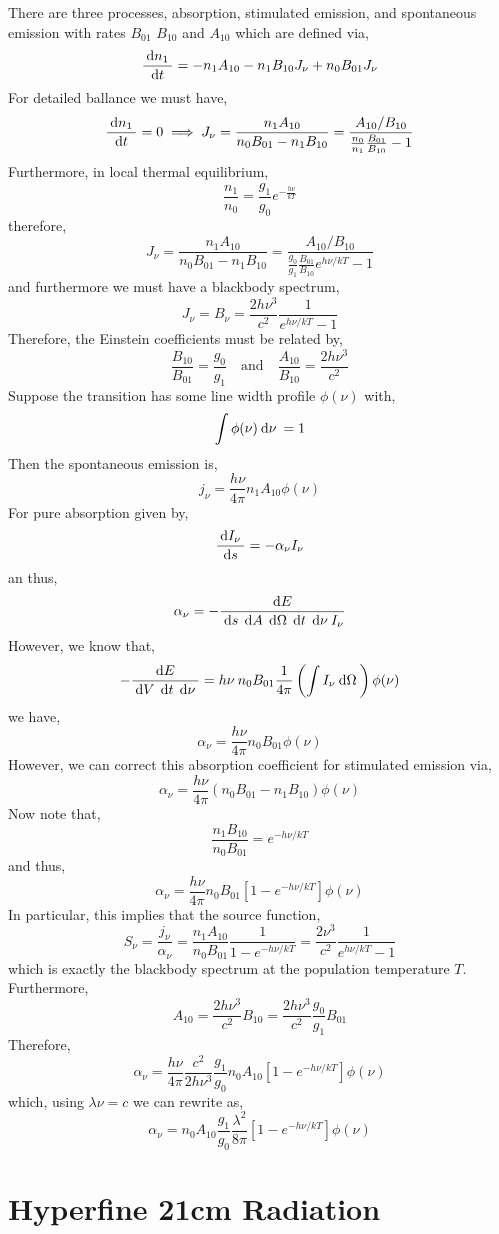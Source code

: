 \documentclass[11pt, a4paper]{article}
\begin{document}
There are three processes, absorption, stimulated emission, and spontaneous emission with rates $B_{01}$ $B_{10}$ and $A_{10}$ which are defined via,
\[ \frac{\: \mathrm{d}n_1 \:}{\: \mathrm{d}t \:} = - n_1 A_{10} - n_1 B_{10} J_\nu + n_0 B_{01} J_\nu \]
For detailed ballance we must have,
\[ \frac{\: \mathrm{d}n_1 \:}{\: \mathrm{d}t \:} = 0 \implies J_\nu = \frac{n_1 A_{10}}{n_0 B_{01} - n_1 B_{10}} = \frac{A_{10} / B_{10}}{\frac{n_0}{n_1} \frac{B_{01}}{B_{10}} - 1} \]
Furthermore, in local thermal equilibrium,
\[ \frac{n_1}{n_0} = \frac{g_1}{g_0} e^{-\frac{h\nu}{kT}} \]
therefore,
\[ J_\nu = \frac{n_1 A_{10}}{n_0 B_{01} - n_1 B_{10}} = \frac{A_{10} / B_{10}}{\frac{g_0}{g_1} \frac{B_{01}}{B_{10}} e^{h \nu / kT}  - 1} \]
and furthermore we must have a blackbody spectrum,
\[ J_\nu = B_\nu = \frac{2 h \nu^3}{c^2} \frac{1}{e^{h \nu / k T} - 1} \]
Therefore, the Einstein coefficients must be related by,
\[  \frac{B_{10}}{B_{01}} = \frac{g_0}{g_1}  \quad \text{and} \quad \frac{A_{10}}{B_{10}} = \frac{2 h \nu^3}{c^2} \]
Suppose the transition has some line width profile $\phi(\nu)$ with,
\[ \int \phi(\nu) \: \mathrm{d}\nu \: = 1 \]
Then the spontaneous emission is,
\[ j_\nu = \frac{h \nu}{4 \pi} n_1 A_{10}  \phi(\nu) \]
For pure absorption given by,
\[ \frac{\: \mathrm{d}I_\nu \:}{\: \mathrm{d}s \:} = -\alpha_\nu I_\nu \]
an thus,
\[ \alpha_\nu = -\frac{\: \mathrm{d}E \:}{\: \mathrm{d}s \: \: \mathrm{d}A \: \: \mathrm{d}\Omega \: \: \mathrm{d}t \: \: \mathrm{d}\nu \: I_\nu} \] 
However, we know that,
\[ - \frac{\: \mathrm{d}E \:}{\: \mathrm{d}V \: \: \mathrm{d}t \: \: \mathrm{d}\nu \: } = h \nu \: n_0 B_{01} \frac{1}{4\pi} \left( \int I_\nu \: \mathrm{d}\Omega \: \right) \phi(\nu) \]
we have,
\[ \alpha_\nu = \frac{h \nu}{4 \pi} n_0 B_{01}  \phi(\nu) \]
However, we can correct this absorption coefficient for stimulated emission via,
\[ \alpha_\nu = \frac{h \nu}{4 \pi} (n_0 B_{01} - n_1 B_{10}) \phi(\nu) \]
Now note that,
\[ \frac{n_1 B_{10}}{n_0 B_{01}} = e^{-h \nu / k T} \]
and thus,
\[ \alpha_\nu = \frac{h \nu}{4 \pi} n_0 B_{01}[1 - e^{- h \nu / k T}] \phi(\nu) \]
In particular, this implies that the source function,
\[ S_\nu = \frac{j_\nu}{\alpha_\nu} = \frac{n_1 A_{10}}{n_0 B_{01}} \frac{1}{1 - e^{-h\nu / kT}} = \frac{2 \nu^3}{c^2} \frac{1}{e^{h \nu / kT} - 1} \]
which is exactly the blackbody spectrum at the population temperature $T$.
Furthermore,
\[ A_{10} = \frac{2 h \nu^3}{c^2} B_{10} = \frac{2 h \nu^3}{c^2} \frac{g_0}{g_1} B_{01} \] 
Therefore,
\[ \alpha_\nu = \frac{h \nu}{4 \pi} \frac{c^2}{2 h \nu^3} \frac{g_1}{g_0} n_0 A_{10} [1 - e^{- h \nu / k T}] \phi(\nu) \]
which, using $\lambda \nu = c$ we can rewrite as,
\[ \alpha_\nu =  n_0 A_{10} \frac{g_1}{g_0} \frac{\lambda^2}{8 \pi} [1 - e^{- h \nu / k T}] \phi(\nu) \]

\section{Hyperfine 21cm Radiation}
\end{document}
